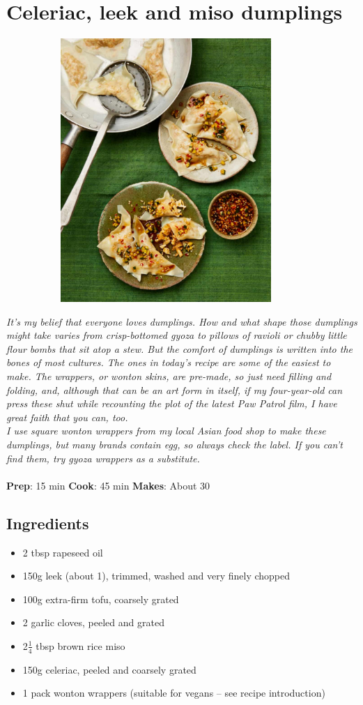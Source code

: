 \documentclass{book}
\begin{document}
\section{Celeriac, leek and miso dumplings}
\begin{figure}
\centering\includegraphics[width=10cm,height=10cm,keepaspectratio]{Recipe_Pictures/Celeriac,_leek_and_miso_dumplings.png}
\end{figure}
\emph{It’s my belief that everyone loves dumplings. How and what shape those dumplings might take varies from crisp-bottomed gyoza to pillows of ravioli or chubby little flour bombs that sit atop a stew. But the comfort of dumplings is written into the bones of most cultures. The ones in today’s recipe are some of the easiest to make. The wrappers, or wonton skins, are pre-made, so just need filling and folding, and, although that can be an art form in itself, if my four-year-old can press these shut while recounting the plot of the latest Paw Patrol film, I have great faith that you can, too.\\ 
I use square wonton wrappers from my local Asian food shop to make these dumplings, but many brands contain egg, so always check the label. If you can’t find them, try gyoza wrappers as a substitute.}\\\\ 
\textbf{Prep}: 15 min
\textbf{Cook}: 45 min
\textbf{Makes}: About 30
\subsection*{Ingredients}
\begin{itemize}
\item 2 tbsp rapeseed oil
\item 150g leek (about 1), trimmed, washed and very finely chopped
\item 100g extra-firm tofu, coarsely grated
\item 2 garlic cloves, peeled and grated
\item 2$\frac{1}{4}$ tbsp brown rice miso
\item 150g celeriac, peeled and coarsely grated
\item 1 pack wonton wrappers (suitable for vegans – see recipe introduction)
\end{itemize}
\end{document}
